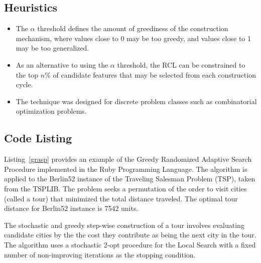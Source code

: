 \subsection{Heuristics}
\begin{itemize}
	\item The $\alpha$ threshold defines the amount of greediness of the construction mechanism, where values close to 0 may be too greedy, and values close to 1 may be too generalized.
	\item As an alternative to using the $\alpha$ threshold, the RCL can be constrained to the top $n\%$ of candidate features that may be selected from each construction cycle.
	\item The technique was designed for discrete problem classes such as combinatorial optimization problems.
\end{itemize}

\subsection{Code Listing}
Listing~\ref{grasp} provides an example of the Greedy Randomized Adaptive Search Procedure implemented in the Ruby Programming Language. 
The algorithm is applied to the Berlin52 instance of the Traveling Salesman Problem (TSP), taken from the TSPLIB. The problem seeks a permutation of the order to visit cities (called a tour) that minimized the total distance traveled. The optimal tour distance for Berlin52 instance is 7542 units.

The stochastic and greedy step-wise construction of a tour involves evaluating candidate cities by the the cost they contribute as being the next city in the tour. 
The algorithm uses a stochastic 2-opt procedure for the Local Search with a fixed number of non-improving iterations as the stopping condition.

